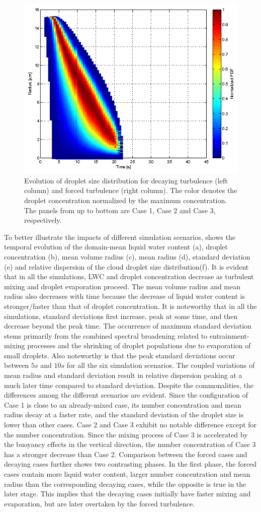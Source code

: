 \documentclass[draft,linenumbers]{AGUJournal}
\begin{document}
\begin{figure}[!htbp]
\includegraphics[width=0.48\linewidth]{Figures/pdf_radius_f3}
\caption{Evolution of droplet size distribution for decaying turbulence (left column) and forced turbulence (right column). The color denotes the droplet concentration normalized by the maximum concentration. The panels from up to bottom are Case 1, Case 2 and Case 3, respectively.} \label{fig:rad_distri}
\end{figure}

To better illustrate the impacts of different simulation scenarios,  shows the temporal evolution of the domain-mean liquid water content (a), droplet concentration (b), 
mean volume radius (c), mean radius (d), standard deviation (e) and relative dispersion of the cloud droplet size distribution(f). It is evident that in all the simulations, LWC and droplet concentration decrease as turbulent mixing and droplet evaporation proceed. The mean volume radius and mean radius also decreases with time because the decrease of liquid water content is stronger/faster than that of droplet concentration. It is noteworthy that in all the simulations, standard deviations first increase, peak at some time, and then decrease beyond the peak time. The occurrence of maximum standard deviation stems primarily from the combined spectral broadening related to entrainment-mixing processes and the shrinking of droplet populations due to evaporation of small droplets. Also noteworthy is that the peak standard deviations occur between $5s$ and $10s$ for all the six simulation scenarios. The coupled variations of mean radius and standard deviation result in relative dispersion peaking at a much later time compared to standard deviation. Despite the commonalities, the differences among the different scenarios are evident. Since the configuration of Case 1 is close to an already-mixed case, its number concentration and mean radius decay at a faster rate, and the standard deviation of the droplet size is lower than other cases. Case 2 and Case 3 exhibit no notable difference except for the number concentration. Since the mixing process of Case 3 is accelerated by the buoyancy effects in the vertical direction, the number concentration of Case 3 has a stronger decrease than Case 2. Comparison between the forced cases and decaying cases further shows two contrasting phases. In the first phase, the forced cases contain more liquid water content, larger number concentration and mean radius than the corresponding decaying cases, while the opposite is true in the later stage. This implies that the decaying cases initially have faster mixing and evaporation, but are later overtaken by the forced turbulence. 
  
\end{document}
